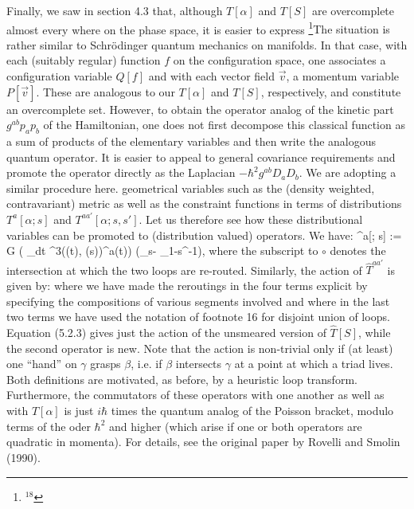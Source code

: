 Finally, we saw in section 4.3 that, although  $T[\alpha]$ and $T[S]$ are
overcomplete almost every where on the phase space, it is easier to express%
\footnote{$^{18}$}{The situation is rather similar to Schr\"odinger quantum
mechanics on manifolds. In that case, with each (suitably regular) function
$f$ on the configuration space, one associates a configuration variable
$Q[f]$ and with each vector field $\vec v$, a momentum variable $P[\vec v]$.
These are analogous to our $T[\alpha]$ and $T[S]$, respectively, and constitute
an overcomplete set. However, to obtain the operator analog of the kinetic
part $g^{ab}p_ap_b$ of the Hamiltonian, one does not first decompose this
classical function as a sum of products of the elementary variables and then
write the analogous quantum operator. It is easier to appeal to general
covariance requirements and promote the operator directly as the Laplacian
$-\hbar^2 g^{ab}D_a D_b$. We are adopting a similar procedure here.}
geometrical variables such as the (density weighted, contravariant) metric
as well as the constraint functions in terms of
distributions $T^a[\alpha; s]$ and $T^{aa'}[\alpha; s,s']$. Let us therefore
see how these distributional variables can be promoted to (distribution
valued) operators. We have:
\bneq
\langle\beta\mid \circ {}^a[\gamma; s] := {\hbar G} \big(
\oint_\beta dt \delta^3(\beta(t), \gamma(s))\dot\beta^a(t)\big)\-\cdot\-
\big(\langle\beta\circ_s\gamma\mid -
\langle \beta\circ_{1-s}\gamma^{-1}\mid \big),
where the subscript to $\circ$ denotes the intersection at which the two
loops are re-routed. Similarly, the action of $\hat{T}^{aa'}$ is given by:
where we have made the reroutings in the four terms explicit by specifying
the compositions of various segments involved and where in the last two terms
we have used the notation of footnote 16 for disjoint union of loops.
Equation (5.2.3) gives just the action of the unsmeared version
of $\hat{T}[S]$, while the second operator is new. Note that the action is
non-trivial only if (at least) one ``hand'' on $\gamma$ grasps $\beta$, i.e.
if $\beta$ intersects $\gamma$ at a point at which a triad lives. Both
definitions  are motivated, as before, by a heuristic loop transform.
Furthermore, the commutators of these operators with one another as well as
with $\hat{T}[\alpha ]$ is just $i\hbar$ times the quantum analog of the
Poisson bracket, modulo terms of the oder $\hbar^2$ and higher (which arise
if one or both operators are quadratic in momenta). For details, see the
original paper by Rovelli and Smolin (1990).

